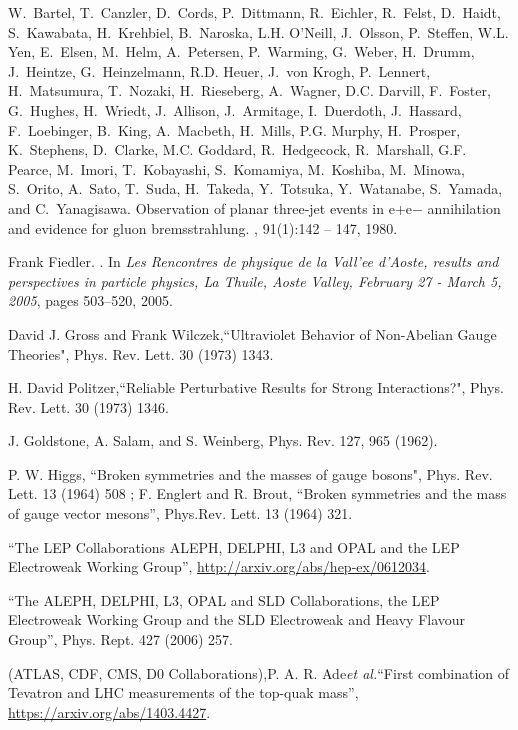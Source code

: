 \begin{thebibliography}{99}
W.~Bartel, T.~Canzler, D.~Cords, P.~Dittmann, R.~Eichler, R.~Felst, D.~Haidt,
  S.~Kawabata, H.~Krehbiel, B.~Naroska, L.H. O'Neill, J.~Olsson, P.~Steffen,
  W.L. Yen, E.~Elsen, M.~Helm, A.~Petersen, P.~Warming, G.~Weber, H.~Drumm,
  J.~Heintze, G.~Heinzelmann, R.D. Heuer, J.~von Krogh, P.~Lennert,
  H.~Matsumura, T.~Nozaki, H.~Rieseberg, A.~Wagner, D.C. Darvill, F.~Foster,
  G.~Hughes, H.~Wriedt, J.~Allison, J.~Armitage, I.~Duerdoth, J.~Hassard,
  F.~Loebinger, B.~King, A.~Macbeth, H.~Mills, P.G. Murphy, H.~Prosper,
  K.~Stephens, D.~Clarke, M.C. Goddard, R.~Hedgecock, R.~Marshall, G.F. Pearce,
  M.~Imori, T.~Kobayashi, S.~Komamiya, M.~Koshiba, M.~Minowa, S.~Orito,
  A.~Sato, T.~Suda, H.~Takeda, Y.~Totsuka, Y.~Watanabe, S.~Yamada, and
  C.~Yanagisawa.
\newblock Observation of planar three-jet events in e+e− annihilation and
  evidence for gluon bremsstrahlung.
, 91(1):142 -- 147, 1980.



Frank Fiedler.
.
\newblock In {\em {Les Rencontres de physique de la Vall'ee d'Aoste, results
  and perspectives in particle physics, La Thuile, Aoste Valley, February 27 -
  March 5, 2005}}, pages 503--520, 2005.


 David J. Gross and Frank Wilczek,``Ultraviolet Behavior of Non-Abelian Gauge Theories", Phys. Rev. Lett. 30 (1973) 1343.

 H. David Politzer,``Reliable Perturbative Results for Strong Interactions?", Phys. Rev. Lett. 30 (1973) 1346.

 {J. Goldstone}, A. Salam, and S. Weinberg, Phys. Rev. 127, 965 (1962).


 P. W. Higgs, ``Broken symmetries and the masses of gauge bosons", Phys. Rev. Lett. 13 (1964) 508 ; F. Englert and R. Brout, ``Broken symmetries and the mass of gauge vector mesons'', Phys.Rev. Lett. 13 (1964) 321.


  ``The  LEP  Collaborations  ALEPH,  DELPHI,  L3  and  OPAL  and  the  LEP  Electroweak  Working Group'', \url{http://arxiv.org/abs/hep-ex/0612034}.

 ``The ALEPH, DELPHI, L3, OPAL and SLD Collaborations, the LEP Electroweak Working Group and the SLD Electroweak and Heavy Flavour Group'', Phys. Rept. 427 (2006) 257.

  (ATLAS, CDF, CMS, D0 Collaborations),P. A. R. Ade{\it et al.}``First combination of Tevatron and LHC measurements of the top-quak mass'', \url{https://arxiv.org/abs/1403.4427}.


\end{thebibliography}
